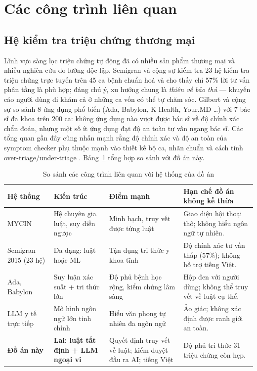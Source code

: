\section{Các công trình liên quan}

\subsection{Hệ kiểm tra triệu chứng thương mại}

Lĩnh vực sàng lọc triệu chứng tự động đã có nhiều sản phẩm thương mại và nhiều
nghiên cứu đo lường độc lập. Semigran và cộng sự \cite{Semigran2015} kiểm tra
23 hệ kiểm tra triệu chứng trực tuyến trên 45 ca bệnh chuẩn hoá và cho thấy
chỉ 57\% lời tư vấn phân tầng là phù hợp; đáng chú ý, xu hướng chung là
\emph{thiên về bảo thủ} — khuyến cáo người dùng đi khám cả ở những ca vốn có
thể tự chăm sóc. Gilbert và cộng sự \cite{Gilbert2020} so sánh 8 ứng dụng phổ
biến (Ada, Babylon, K Health, Your.MD \dots) với 7 bác sĩ đa khoa trên 200 ca:
không ứng dụng nào vượt được bác sĩ về độ chính xác chẩn đoán, nhưng một số ít
ứng dụng đạt độ an toàn tư vấn ngang bác sĩ. Các tổng quan gần đây cũng nhấn mạnh
rằng độ chính xác và độ an toàn của symptom checker phụ thuộc mạnh vào thiết kế
bộ ca, nhãn chuẩn và cách tính over-triage/under-triage
\cite{RiboliSasco2023, Painter2022}. Bảng~\ref{tab:related} tổng hợp so sánh
với đồ án này.

\begin{table}[H]
\centering
\caption{So sánh các công trình liên quan với hệ thống của đồ án}
\label{tab:related}
\small
\setlength{\tabcolsep}{3.0pt}
\begin{tabular}{|p{2.6cm}|p{3.2cm}|p{3.2cm}|p{4.6cm}|}
\toprule
\textbf{Hệ thống} & \textbf{Kiến trúc} & \textbf{Điểm mạnh} & \textbf{Hạn chế đồ án không kế thừa} \\
\midrule
MYCIN \cite{Buchanan1984} & Hệ chuyên gia luật, suy diễn ngược & Minh bạch,
truy vết được từng luật & Giao diện hội thoại thô; không hiểu ngôn ngữ tự nhiên. \\
Semigran 2015 \cite{Semigran2015} (23 hệ) & Đa dạng: luật hoặc ML & Tận dụng
tri thức y khoa tĩnh & Độ chính xác tư vấn thấp (57\%); không hỗ trợ tiếng Việt. \\
Ada, Babylon \cite{Gilbert2020} & Suy luận xác suất + tri thức lớn & Độ phủ
bệnh học rộng, kiểm chứng lâm sàng & Hộp đen với người dùng; không thể truy
vết về luật cụ thể. \\
LLM y tế trực tiếp \cite{Singhal2023} & Mô hình ngôn ngữ lớn tinh chỉnh & Hiểu
văn phong tự nhiên đa ngôn ngữ & Ảo giác; không xác định được ranh giới an toàn. \\
\midrule
\textbf{Đồ án này} & \textbf{Lai: luật tất định + LLM ngoại vi} & Quyết định
truy vết về luật; kiểm duyệt đầu ra AI; tiếng Việt & Độ phủ tri thức 31 triệu
chứng còn hẹp. \\
\bottomrule
\end{tabular}
\end{table}

